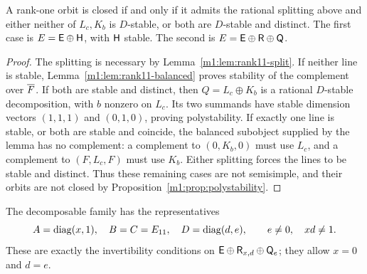 \begin{proposition}\label{m1:prop:rank11}
A rank-one orbit is closed if and only if it admits the rational
splitting above and either neither of $L_c,K_b$ is $D$-stable, or both
are $D$-stable and distinct. The first case is
$E=\mathsf E\oplus\mathsf H$, with $\mathsf H$ stable. The second is
$E=\mathsf E\oplus\mathsf R\oplus\mathsf Q$.
\end{proposition}
\begin{proof}
The splitting is necessary by Lemma~\ref{m1:lem:rank11-split}. If neither
line is stable, Lemma~\ref{m1:lem:rank11-balanced} proves stability of the
complement over $\overline F$. If both are stable and distinct, then
$Q=L_c\oplus K_b$ is a rational $D$-stable decomposition, with $b$
nonzero on $L_c$. Its two summands have stable dimension vectors
$(1,1,1)$ and $(0,1,0)$, proving polystability.
If exactly one line is stable, or both are stable and coincide, the
balanced subobject supplied by the lemma has no complement: a complement
to $(0,K_b,0)$ must use $L_c$, and a complement to $(F,L_c,F)$ must use
$K_b$. Either splitting forces the lines to be stable and distinct.
Thus these remaining cases are not semisimple, and their orbits are
not closed by Proposition~\ref{m1:prop:polystability}.
\end{proof}

The decomposable family has the representatives
\begin{equation}\label{m1:eq:decomposable-rep}
 A=\operatorname{diag}(x,1),\quad B=C=E_{11},\quad D=\operatorname{diag}(d,e),
 \qquad e\neq0,\quad xd\neq1.
\end{equation}
These are exactly the invertibility conditions on
$\mathsf E\oplus\mathsf R_{x,d}\oplus\mathsf Q_e$; they allow $x=0$ and $d=e$.


